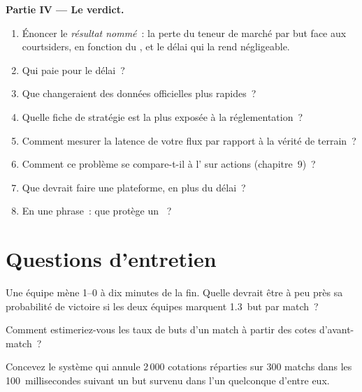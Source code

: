\begin{problem}
\medskip\noindent\textbf{Partie IV --- Le verdict.}
\begin{enumerate}[resume]
\item Énoncer le \emph{résultat nommé}~: la perte du teneur de marché par but face aux courtsiders, en fonction du , et le délai qui la rend
négligeable.
\item Qui paie pour le délai~?
\item Que changeraient des données officielles plus rapides~?
\item Quelle fiche de stratégie est la plus exposée à la réglementation~?
\item Comment mesurer la latence de votre flux par rapport à la vérité de terrain~?
\item Comment ce problème se compare-t-il à l' sur actions (chapitre~9)~?
\item Que devrait faire une plateforme, en plus du délai~?
\item En une phrase~: que protège un ~?
\end{enumerate}
\end{problem}

\section{Questions d'entretien}

\begin{interviewq}\label{iq:hf:prediction-and-sports-market-making:1}
Une équipe mène 1--0 à dix minutes de la fin. Quelle devrait être à peu près sa probabilité de victoire si les deux équipes marquent 1.3~but par match~?
\end{interviewq}

\begin{interviewq}\label{iq:hf:prediction-and-sports-market-making:2}
Comment estimeriez-vous les taux de buts d'un match à partir des cotes d'avant-match~?
\end{interviewq}

\begin{interviewq}\label{iq:hf:prediction-and-sports-market-making:3}
Concevez le système qui annule 2\,000 cotations réparties sur 300 matchs dans les 100~millisecondes suivant un but survenu dans l'un quelconque d'entre eux.
\end{interviewq}

